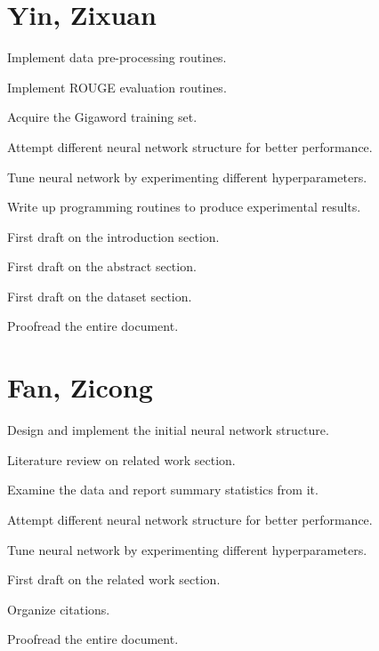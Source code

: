 \begin{appendices}

\section{Yin, Zixuan} 

\begin{compactitem}
\item Implement data pre-processing routines. 
\item Implement ROUGE evaluation routines.
\item Acquire the Gigaword training set. 
\item Attempt different neural network structure for better performance.
\item Tune neural network by experimenting different hyperparameters.
\item Write up programming routines to produce experimental results.
\item First draft on the introduction section.
\item First draft on the abstract section.
\item First draft on the dataset section.
\item Proofread the entire document.
\end{compactitem}


\section{Fan, Zicong }
\begin{compactitem}
\item Design and implement the initial neural network structure.
\item Literature review on related work section.
\item Examine the data and report summary statistics from it. 
\item Attempt different neural network structure for better performance.
\item Tune neural network by experimenting different hyperparameters.
\item First draft on the related work section.
\item Organize citations.
\item Proofread the entire document.
\end{compactitem}


\end{appendices}
